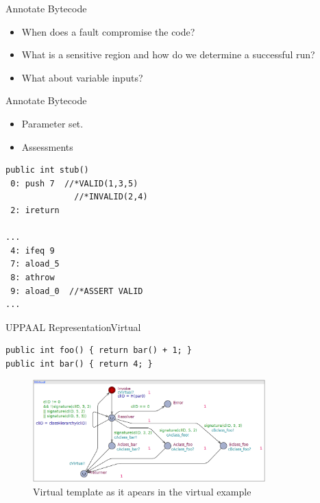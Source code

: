 

\begin{frame}{Annotate Bytecode}{}
\begin{itemize}
\item When does a fault compromise the code?
\item What is a sensitive region and how do we determine a successful run?
\item What about variable inputs? 
\end{itemize}
\end{frame}

\begin{frame}[fragile]{Annotate Bytecode}{}
\begin{minipage}{.30\textwidth}
\begin{itemize}
\item Parameter set.
\item Assessments
\end{itemize}

\end{minipage}%
\hspace{20px}
\begin{minipage}{0.60\textwidth}
\begin{lstlisting}[frame=single]
public int stub()
 0: push 7  //*VALID(1,3,5)
 	          //*INVALID(2,4)
 2: ireturn 

...
 4: ifeq 9
 7: aload_5 
 8: athrow
 9: aload_0  //*ASSERT VALID
...
\end{lstlisting}
\end{minipage}
\end{frame}

\begin{frame}[fragile]{UPPAAL Representation}{Virtual}


\begin{lstlisting}[frame=single]
public int foo() { return bar() + 1; }
public int bar() { return 4; }
\end{lstlisting}

\begin{figure}
\centering
\includegraphics[width=0.8\textwidth]{figures/oldvirtual.png}
\caption{\footnotesize Virtual template as it apears in the virtual example}
\end{figure}
\end{frame}

